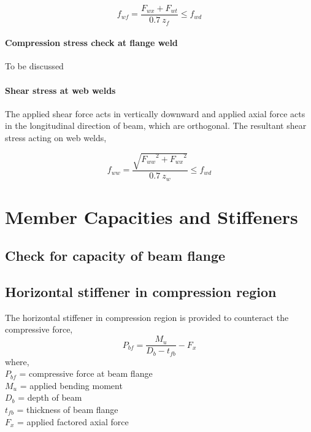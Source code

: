 \documentclass[11.5pt,a4paper,oneside]{report}
\begin{document}
\begin{Form}
\begin{equation}
	f_{wf} = \frac{F_{wx} + F_{wt}}{0.7~z_f} \leq f_{wd}
\end{equation}

\subsubsection{Compression stress check at flange weld}
To be discussed

\subsubsection{Shear stress at web welds}
The applied shear force acts in vertically downward and 
applied axial force acts in the longitudinal direction of beam,
which are orthogonal. 
The resultant shear stress acting on web welds,

\begin{equation}
	f_{ww} = \frac{\sqrt{{F_{ww}}^2 + {F_{wx}}^2}}{0.7~z_w} \leq f_{wd}
\end{equation}


\chapter{Member Capacities and Stiffeners}
\section{Check for capacity of beam flange}
\section{Horizontal stiffener in compression region}
The horizontal stiffener in compression region is provided to counteract
the compressive force, 
\begin{equation}
	P_{bf} = \frac{M_u}{D_b - t_{fb}} - F_x
\end{equation}
where, \\
\indent $P_{bf}$ = compressive force at beam flange \\ 
\indent ${M_u}$ = applied bending moment \\ 
\indent $D_b$ = depth of beam \\
\indent $t_{fb}$ = thickness of beam flange \\
\indent $F_x$ = applied factored axial force \\



\end{Form}
\end{document}
